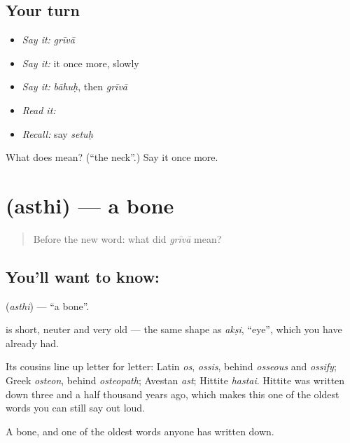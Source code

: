 \subsection*{Your turn}
\begin{itemize}
\raggedright
  \item \emph{Say it:} \emph{grīvā}
  \item \emph{Say it:} it once more, slowly
  \item \emph{Say it:} \emph{bāhuḥ}, then \emph{grīvā}
  \item \emph{Read it:} \textbf{}
  \item \emph{Recall:} say \emph{setuḥ}
\end{itemize}

\begin{tcolorbox}[breakable,colback=teal!4,colframe=teal!35!black,title={Before you move on}]
What does  mean? (\textquotedblleft{}the neck\textquotedblright{}.) Say it once more.
\end{tcolorbox}
\section[\texorpdfstring{\sk{अस्थि} (asthi)}{अस्थि (asthi)}]{ (asthi) — a bone}

\label{lesson:SA-C34-bone}



\begin{quote}
Before the new word: what did \emph{grīvā} mean?
\end{quote}

\subsection*{You'll want to know: }
\textbf{} (\emph{asthi}) — \textquotedblleft{}a bone\textquotedblright{}.

\textbf{} is short, neuter and very old — the same shape as \emph{akṣi}, \textquotedblleft{}eye\textquotedblright{}, which you have already had.

Its cousins line up letter for letter: Latin \emph{os}, \emph{ossis}, behind \emph{osseous} and \emph{ossify}; Greek \emph{osteon}, behind \emph{osteopath}; Avestan \emph{ast}; Hittite \emph{hastai}. Hittite was written down three and a half thousand years ago, which makes this one of the oldest words you can still say out loud.

\begin{grammarlens}[title={What you've built}]
A bone, and one of the oldest words anyone has written down.
\end{grammarlens}


